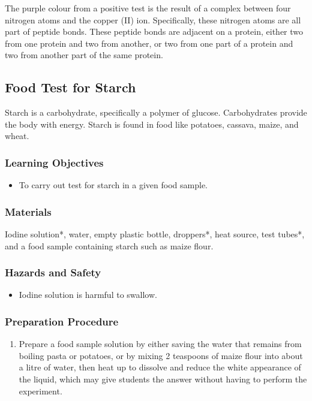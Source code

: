 The purple colour from a positive test is the result of a complex between four nitrogen atoms and the copper (II) ion. Specifically, these nitrogen atoms are all part of peptide bonds. These peptide bonds are adjacent on a protein, either two from one protein and two from another, or two from one part of a protein and two from another part of the same protein.

\subsection{Food Test for Starch}
Starch is a carbohydrate, specifically a polymer of glucose. Carbohydrates provide the body with energy. Starch is found in food like potatoes, cassava, maize, and wheat.

\subsubsection*{Learning Objectives}
\begin{itemize}
\item{To carry out test for starch in a given food sample.}
\end{itemize}

\subsubsection*{Materials}
Iodine solution*, water, empty plastic bottle, droppers*, heat source, test tubes*, and a food sample containing starch such as maize flour.

\subsubsection*{Hazards and Safety}
\begin{itemize}
\item{Iodine solution is harmful to swallow.}
\end{itemize}

\subsubsection*{Preparation Procedure}
\begin{enumerate}
\item{Prepare a food sample solution by either saving the water that remains from boiling pasta or potatoes, or by mixing 2 teaspoons of maize flour into about a litre of water, then heat up to dissolve and reduce the white appearance of the liquid, which may give students the answer without having to perform the experiment.}
\end{enumerate}

